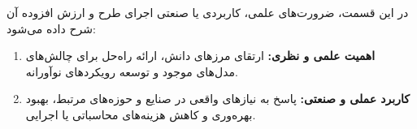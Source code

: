 
در این قسمت، ضرورت‌های علمی، کاربردی یا صنعتی اجرای طرح و ارزش افزوده آن شرح داده می‌شود:

\begin{enumerate}[label=\arabic*-, leftmargin=1.5cm]
    \item \textbf{اهمیت علمی و نظری:} ارتقای مرزهای دانش، ارائه راه‌حل برای چالش‌های مدل‌های موجود و توسعه رویکردهای نوآورانه.
    \item \textbf{کاربرد عملی و صنعتی:} پاسخ به نیازهای واقعی در صنایع و حوزه‌های مرتبط، بهبود بهره‌وری و کاهش هزینه‌های محاسباتی یا اجرایی.
\end{enumerate}
